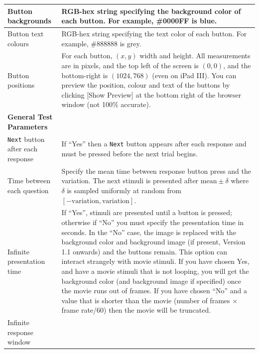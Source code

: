 \documentclass{article}
\begin{document}
\begin{longtable}{|p{5cm}|p{10cm}|}
\hline
Button backgrounds & RGB-hex string specifying the background color of each button. For example,
\#0000FF is blue.\\
\hline
Button text colours & RGB-hex string specifying the text color of each button. For example,
\#888888 is grey.\\
\hline
Button positions & For each button, $(x,y)$ width and height.
All measurements are in pixels, and the top left of the screen is $(0,0)$,
and the bottom-right is $(1024,768)$ (even on iPad III). You can preview the position, colour and text of the buttons by clicking [Show Preview] at the bottom right of the browser window (not 100\% accurate).\\
\hline
\hline
{\bf General Test Parameters} & \\\nopagebreak
{\tt Next} button after each response & If ``Yes'' then a {\tt Next} 
            button appears after each response
            and must be pressed before the next trial begins.\\
\hline
Time between each question & Specify the mean time between response button press and the variation.
The next stimuli is presented after $\mbox{mean}\pm\delta$ where $\delta$ is sampled uniformly at
random from $[-\mbox{variation},\mbox{variation}]$. \\
\hline
Infinite presentation time & If ``Yes'', stimuli are presented until a button is pressed; 
otherwise if ``No'' you must specify the presentation 
time in seconds. In the ``No'' case, the image is replaced with the background color
and background image (if present, Version 1.1 onwards) and the buttons remain. 
This option can interact strangely with movie stimuli. 
If you have chosen Yes, and have a movie stimuli that is not looping, you will get the background
color (and background image if specified) 
once the movie runs out of frames. If you have chosen ``No'' and a value that is shorter than 
the movie (number of frames $\times$ frame rate/60) then the movie will be truncated.\\
\hline
Infinite response window


\end{longtable}
\end{document}
